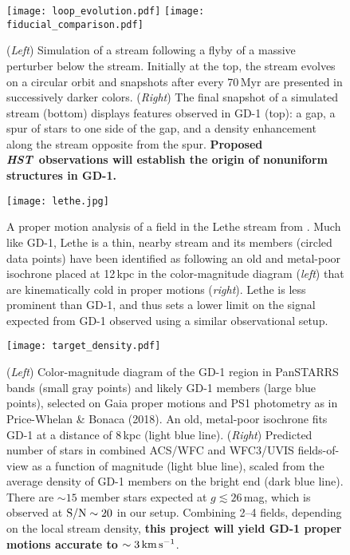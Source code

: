 \documentclass[12pt]{article}
\newcommand{\hst}{\textsl{HST}}
\begin{document}
\begin{figure}
\begin{center}
\texttt{[image: loop\_evolution.pdf]}
\hspace{0.5cm}
\texttt{[image: fiducial\_comparison.pdf]}
\end{center}
\caption{
(\emph{Left}) Simulation of a stream following a flyby of a massive perturber below the stream.
Initially at the top, the stream evolves on a circular orbit and snapshots after every 70\,Myr are presented in successively darker colors.
(\emph{Right}) The final snapshot of a simulated stream (bottom) displays features observed in GD-1 (top): a gap, a spur of stars to one side of the gap, and a density enhancement along the stream opposite from the spur.
\textbf{Proposed \hst\ observations will establish the origin of nonuniform structures in GD-1.}
}
\label{fig:fiducial}
\end{figure}

\begin{figure}
\begin{center}
\texttt{[image: lethe.jpg]}
\end{center}
\caption{
A proper motion analysis of a field in the Lethe stream from \textcite{sohn2016}.
Much like GD-1, Lethe is a thin, nearby stream and its members (circled data points) have been identified as following an old and metal-poor isochrone placed at 12\,kpc in the color-magnitude diagram (\emph{left}) that are kinematically cold in proper motions (\emph{right}).
Lethe is less prominent than GD-1, and thus sets a lower limit on the signal expected from GD-1 observed using a similar observational setup.
}
\label{fig:lethe}
\end{figure}

\begin{figure}
\begin{center}
\texttt{[image: target\_density.pdf]}
\end{center}
\caption{
(\emph{Left}) Color-magnitude diagram of the GD-1 region in PanSTARRS bands (small gray points) and likely GD-1 members (large blue points), selected on Gaia proper motions and PS1 photometry as in Price-Whelan \& Bonaca (2018).
An old, metal-poor isochrone fits GD-1 at a distance of 8\,kpc (light blue line).
(\emph{Right}) Predicted number of stars in combined ACS/WFC and WFC3/UVIS fields-of-view as a function of magnitude (light blue line), scaled from the average density of GD-1 members on the bright end (dark blue line).
There are $\sim15$ member stars expected at $g\lesssim26$\,mag, which is observed at $\rm S/N\sim20$ in our setup.
Combining 2--4 fields, depending on the local stream density, \textbf{this project will yield GD-1 proper motions accurate to $\sim3\,\rm km\,s^{-1}$}.
}
\label{fig:density}
\end{figure}
\end{document}
